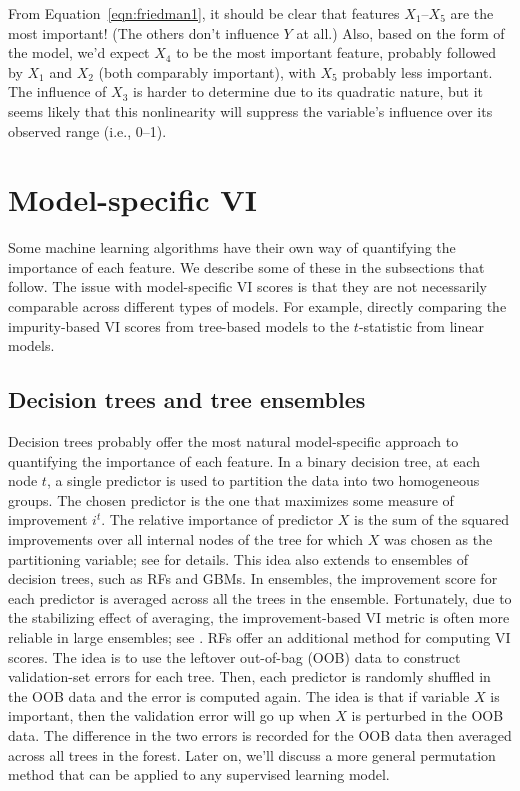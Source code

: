 From Equation~\eqref{eqn:friedman1}, it should be clear that features $X_1$--$X_5$ are the most important! (The others don't influence $Y$ at all.) Also, based on the form of the model, we'd expect $X_4$ to be the most important feature, probably followed by $X_1$ and $X_2$ (both comparably important), with $X_5$ probably less important. The influence of $X_3$ is harder to determine due to its quadratic nature, but it seems likely that this nonlinearity will suppress the variable's influence over its observed range (i.e., 0--1).


\section{Model-specific VI}

Some machine learning algorithms have their own way of quantifying the importance of each feature. We describe some of these in the subsections that follow. The issue with model-specific VI scores is that they are not necessarily comparable across different types of models. For example, directly comparing the impurity-based VI scores from tree-based models to the $t$-statistic from linear models.

\subsection{Decision trees and tree ensembles}

Decision trees probably offer the most natural model-specific approach to quantifying the importance of each feature. In a binary decision tree, at each node $t$, a single predictor is used to partition the data into two homogeneous groups. The chosen predictor is the one that maximizes some measure of improvement $i^t$. The relative importance of predictor $X$ is the sum of the squared improvements over all internal nodes of the tree for which $X$ was chosen as the partitioning variable; see \citet{classification-breiman-1984} for details. This idea also extends to ensembles of decision trees, such as RFs and GBMs. In ensembles, the improvement score for each predictor is averaged across all the trees in the ensemble. Fortunately, due to the stabilizing effect of averaging, the improvement-based VI metric is often more reliable in large ensembles; see \citet[p. 368]{hastie-elements-2009}. RFs offer an additional method for computing VI scores. The idea is to use the leftover out-of-bag (OOB) data to construct validation-set errors for each tree. Then, each predictor is randomly shuffled in the OOB data and the error is computed again. The idea is that if variable $X$ is important, then the validation error will go up when $X$ is perturbed in the OOB data. The difference in the two errors is recorded for the OOB data then averaged across all trees in the forest. Later on, we'll discuss a more general permutation method that can be applied to any supervised learning model.

